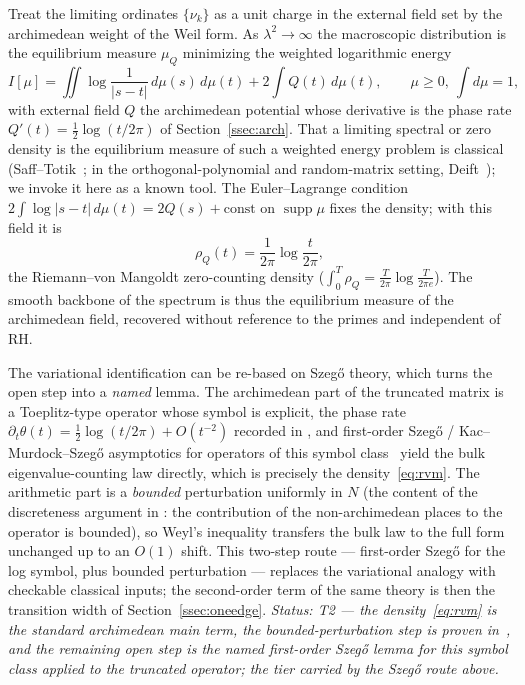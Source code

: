 \documentclass[11pt,a4paper]{article}
\begin{document}
Treat the limiting ordinates $\{\nu_k\}$ as a unit charge in the external field
set by the archimedean weight of the Weil form. As $\lambda^2\to\infty$ the
macroscopic distribution is the equilibrium measure $\mu_Q$ minimizing the
weighted logarithmic energy
\[
  I[\mu]=\iint\log\frac{1}{|s-t|}\,d\mu(s)\,d\mu(t)+2\int Q(t)\,d\mu(t),
  \qquad \mu\ge0,\ \textstyle\int d\mu=1,
\]
with external field $Q$ the archimedean potential whose derivative is the phase
rate $Q'(t)=\tfrac12\log(t/2\pi)$ of Section~\ref{ssec:arch}. That a limiting
spectral or zero density is the equilibrium measure of such a weighted energy
problem is classical (Saff--Totik~\cite{SaffTotik1997}; in the
orthogonal-polynomial and random-matrix setting, Deift~\cite{Deift1999}); we
invoke it here as a known tool. The Euler--Lagrange condition
$2\int\log|s-t|\,d\mu(t)=2Q(s)+\mathrm{const}$ on $\operatorname{supp}\mu$ fixes
the density; with this field it is
\begin{equation}\label{eq:rvm}
  \rho_Q(t)=\frac{1}{2\pi}\log\frac{t}{2\pi},
\end{equation}
the Riemann--von Mangoldt zero-counting density
($\int_0^T\rho_Q=\tfrac{T}{2\pi}\log\tfrac{T}{2\pi e}$). The smooth backbone of
the spectrum is thus the equilibrium measure of the archimedean field, recovered
without reference to the primes and independent of RH.

The variational identification can be re-based on Szeg\H{o} theory, which turns
the open step into a \emph{named} lemma. The archimedean part of the truncated
matrix is a Toeplitz-type operator whose symbol is explicit, the phase rate
$\partial_t\theta(t)=\tfrac12\log(t/2\pi)+O(t^{-2})$ recorded in
\cite[eq.~(3.24)]{CCM2025}, and first-order Szeg\H{o} /
Kac--Murdock--Szeg\H{o} asymptotics for operators of this symbol
class~\cite{KMS1953,Widom1982} yield the bulk eigenvalue-counting law directly,
which is precisely the density~\eqref{eq:rvm}. The arithmetic part is a
\emph{bounded} perturbation uniformly in $N$ (the content of the discreteness
argument in \cite[Thm.~3.6]{CCM2025}: the contribution of the non-archimedean
places to the operator is bounded), so Weyl's inequality transfers the bulk law
to the full form unchanged up to an $O(1)$ shift. This two-step route ---
first-order Szeg\H{o} for the log symbol, plus bounded perturbation ---
replaces the variational analogy with checkable classical inputs; the
second-order term of the same theory
\cite{LandauWidom1980,Widom1982,Israel2015} is then the transition width of
Section~\ref{ssec:oneedge}. \emph{Status: T2 --- the density~\eqref{eq:rvm} is
the standard archimedean main term, the bounded-perturbation step is proven
in~\cite{CCM2025}, and the remaining open step is the named first-order
Szeg\H{o} lemma for this symbol class applied to the truncated operator;
the tier carried by the Szeg\H{o} route above.}
\end{document}

